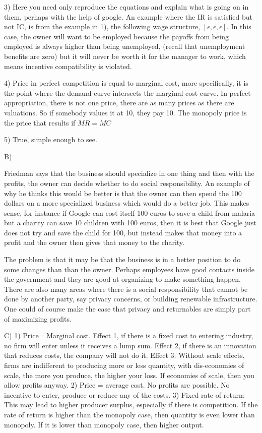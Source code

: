 \documentclass[12pt]{report}
\numberwithin{equation}{section}
\begin{document}
3) Here you need only reproduce the equations and explain what is going on in them, perhaps with the help of google. An example where the IR is satisfied but not IC, is from the example in 1), the following wage structure, $[\epsilon, \epsilon, \epsilon]$. In this case, the owner will want to be employed because the payoffs from being employed is always higher than being unemployed, (recall that unemployment benefits are zero) but it will never be worth it for the manager to work, which means incentive compatibility is violated. 

4) Price in perfect competition is equal to marginal cost, more specifically, it is the point where the demand curve intersects the marginal cost curve. In perfect appropriation, there is not one price, there are as many prices as there are valuations. So if somebody values it at 10, they pay 10. The monopoly price is the price that results if $MR=MC$ 

5) True, simple enough to see. 


B)

Friedman says that the business should specialize in one thing and then with the profits, the owner can decide whether to do social responsibility. An example of why he thinks this would be better is that the owner can then spend the 100 dollars on a more specialized business which would do a better job. This makes sense, for instance if Google can cost itself 100 euros to save a child from malaria but a charity can save 10 children with 100 euros, then it is best that Google just does not try and save the child for 100, but instead makes that money into a profit and the owner then gives that money to the charity. 

The problem is that it may be that the business is in a better position to do some changes than than the owner. Perhaps employees have good contacts inside the government and they are good at organizing to make something happen. There are also many areas where there is a social responsibility that cannot be done by another party, say privacy concerns, or building renewable infrastructure. One could of course make the case that privacy and returnables are simply part of maximizing profits. 

C) 
1) Price= Marginal cost. Effect 1, if there is a fixed cost to entering industry, no firm will enter unless it receives a lump sum. Effect 2, if there is an innovation that reduces costs, the company will not do it. Effect 3: Without scale effects, firms are indifferent to producing more or less quantity, with dis-economies of scale, the more you produce, the higher your loss. If economies of scale, then you allow profits anyway. 
2) Price = average cost. No profits are possible. No incentive to enter, produce or reduce any of the costs. 
3) Fixed rate of return: This may lead to higher producer surplus, especially if there is competition. If the rate of return is higher than the monopoly case, then quantity is even lower than monopoly. If it is lower than monopoly case, then higher output. 
\end{document}
